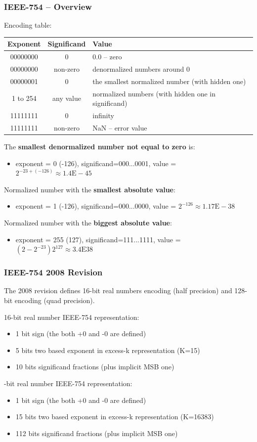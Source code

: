 \documentclass{beamer}
\begin{document}
\begin{frame}[shrink=5]
\frametitle{IEEE-754 -- Overview}

Encoding table:
\begin{tabular}{|c|c|l|}\hline
Exponent & Significand &  Value \\ \hline
00000000 & 0 &  0.0 -- zero \\ \hline
00000000 & non-zero &  denormalized numbers around 0 \\ \hline
00000001 & 0 & the smallest normalized number (with hidden one) \\ \hline
\small 1 to 254 & any value &  normalized numbers (with hidden one in significand)  \\ \hline
11111111 & 0 &  infinity \\ \hline
11111111 & non-zero &  NaN -- error value \\ \hline
\end{tabular}
\bigskip

The \textbf{smallest denormalized number not equal to zero} is:
\begin{itemize}
\item \small exponent = 0 (-126), significand=000...0001, value = $2^{-23+(-126)} \approx 1.4\text{E}-45$
\end{itemize}
Normalized number with the \textbf{smallest absolute value}:
\begin{itemize}
\item \small exponent = 1 (-126), significand=000...0000, value = $2^{-126} \approx 1.17\text{E}-38$
\end{itemize}
Normalized number with the \textbf{biggest absolute value}:
\begin{itemize}
\item \small exponent = 255 (127), significand=111...1111, value = $(2-2^{-23})2^{127} \approx 3.4\text{E}38$
\end{itemize}
\end{frame}


\begin{frame}
\frametitle{IEEE-754 2008 Revision }

The 2008 revision defines 16-bit real numbers encoding (half precision) and 128-bit encoding (quad precision).

16-bit real number IEEE-754 representation:
\begin{itemize}
\item 1 bit sign (the both +0 and -0 are defined)
\item 5 bits two based exponent in excess-k representation (K=15)
\item 10 bits significand fractions (plus implicit MSB one)
\end{itemize}
-bit real number IEEE-754 representation:
\begin{itemize}
\item 1 bit sign (the both +0 and -0 are defined)
\item 15 bits two based exponent in excess-k representation (K=16383)
\item 112 bits significand fractions (plus implicit MSB one)
\end{itemize}

\end{frame}
\end{document}
